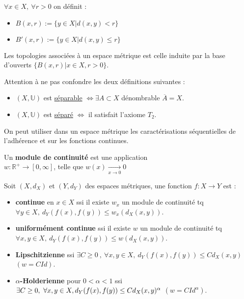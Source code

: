 \begin{definition}
    $\forall x\in X,\ \forall r>0$ on définit :
    \begin{itemize}
        \item $B(x,r):=\{y\in X|d(x,y)<r\} $
        \item $B'(x,r):=\{y\in X|d(x,y)\le r\} $
    \end{itemize}
\end{definition}

Les topologies associées à un espace métrique est celle induite par la base d'ouverts $\{B(x,r)|x\in X,r>0\} $.

\begin{remarque}
Attention à ne pas confondre les deux définitions suivantes : 
    \begin{itemize}
        \item $(X,\mathbb{U})$ est \underline{séparable} $\Leftrightarrow \exists A\subset X $ dénombrable $\overline{A}=X$.
        \item $(X,\mathbb{U})$ est \underline{séparé} $\Leftrightarrow $ il satisfait l'axiome $T_2$.
\end{itemize}
\end{remarque}

On peut utiliser dans un espace métrique les caractérisations séquentielles de l'adhérence et sur les fonctions continues.

\begin{definition}
    Un \textbf{module de continuité} est une application\\$w:\mathbb{R} ^+\to [0,\infty ]$, telle que $w(x)\underset{x\to 0}{\longrightarrow} 0$
\end{definition}

\begin{definition}
    
Soit $(X,d_X)$ et $(Y,d_Y)$ des espaces métriques, une fonction $f:X\to Y$ est :
\begin{itemize}
    \item \textbf{continue} en $x\in X$ ssi il existe $w_x$ un module de continuité tq \\$ \forall y\in X,\ d_Y(f(x),f(y))\le w_x(d_X(x,y))$.
\item \textbf{uniformément continue} ssi il existe $w$ un module de continuité tq $\forall x,y\in X,\ d_Y(f(x),f(y))\le w(d_X(x,y))$.
\item \textbf{Lipschitzienne} ssi $\exists C \geq 0\ ,\ \forall x,y\in X,\ d_Y(f(x),f(y))\le Cd_X(x,y)$ $(w=CId)$.
\item \textbf{$ \alpha$-Holderienne} pour $ 0<\alpha<1$  ssi $\exists C \geq 0,\ \forall x,y\in X,\\ d_Y(f(x),f(y))\le Cd_X(x,y)^\alpha$ $(w=CId^\alpha)$.
\end{itemize}

\end{definition}



